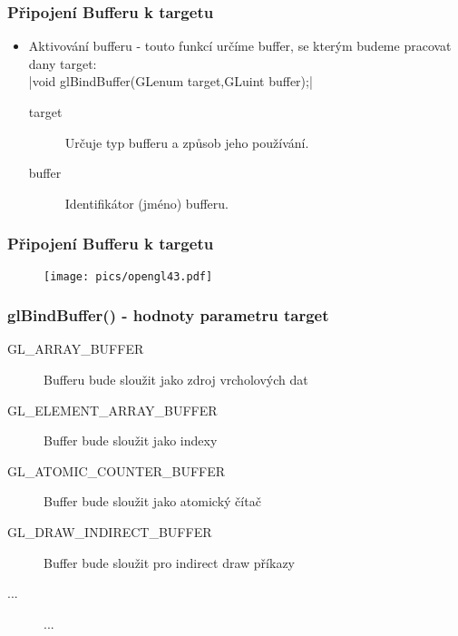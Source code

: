\begin{frame}
\frametitle{Připojení Bufferu k targetu}
	\begin{itemize}

		\item{ Aktivování bufferu - touto funkcí určíme buffer, se kterým budeme pracovat dany target:\\
		{\scriptsize
		|void glBindBuffer(GLenum target,GLuint buffer);|
		}
		\begin{description}
			\item[target] Určuje typ bufferu a způsob jeho používání.
			\item[buffer] Identifikátor (jméno) bufferu.
		\end{description}
		}

	\end{itemize}
\end{frame}

\begin{frame}
\frametitle{Připojení Bufferu k targetu}
	\begin{figure}[h]
	\texttt{[image: pics/opengl43.pdf]}
	\end{figure}
\end{frame}


\begin{frame}
\frametitle{glBindBuffer() - hodnoty parametru target}
		\begin{description}
			\item[GL\_ARRAY\_BUFFER] Bufferu bude sloužit jako zdroj vrcholových dat
			\item[GL\_ELEMENT\_ARRAY\_BUFFER] Buffer bude sloužit jako indexy
			\item[GL\_ATOMIC\_COUNTER\_BUFFER] Buffer bude sloužit jako atomický čítač
			\item[GL\_DRAW\_INDIRECT\_BUFFER] Buffer bude sloužit pro indirect draw příkazy
			\item[...] ...
		\end{description}
\end{frame}

